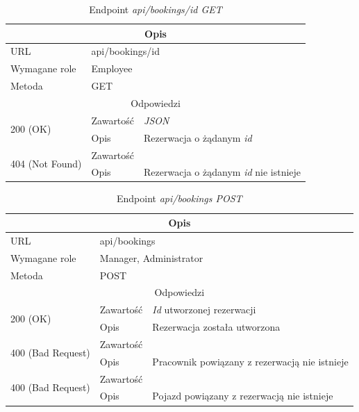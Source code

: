\documentclass[eng,printmode,openany]{mgr}
\begin{document}
\begin{table}[H]
	\caption{Endpoint \textit{api/bookings/id GET}}
	\begin{tabularx}{\textwidth}{|l|l|X|}
		\hline
		\multicolumn{3}{|c|}{Opis}
		\\ \hline
		URL                         & \multicolumn{2}{l|}{api/bookings/id}
		\\ \hline
		Wymagane role               & \multicolumn{2}{l|}{Employee}
		\\ \hline
		Metoda                      & \multicolumn{2}{l|}{GET}
		\\ \hline
		\multicolumn{3}{|c|}{Odpowiedzi}
		\\ \hline
		\multirow{2}{*}{200 (OK)} 	        & Zawartość   	& \textit{JSON}
		\\ \cline{2-3}                      & Opis         	& Rezerwacja o żądanym \textit{id}
		\\ \hline
		\multirow{2}{*}{404 (Not Found)} 	& Zawartość     & 
		\\ \cline{2-3}                      & Opis          & Rezerwacja o żądanym \textit{id} nie istnieje
		\\ \hline
	\end{tabularx}
\end{table}

\begin{table}[H]
	\caption{Endpoint \textit{api/bookings POST}}
	\begin{tabularx}{\textwidth}{|l|l|X|}
		\hline
		\multicolumn{3}{|c|}{Opis}
		\\ \hline
		URL                       & \multicolumn{2}{l|}{api/bookings}
		\\ \hline
		Wymagane role             & \multicolumn{2}{l|}{Manager, Administrator}
		\\ \hline
		Metoda                    & \multicolumn{2}{l|}{POST}
		\\ \hline
		\multicolumn{3}{|c|}{Odpowiedzi}
		\\ \hline
		\multirow{2}{*}{200 (OK)} 		& Zawartość     & \textit{Id} utworzonej rezerwacji
		\\ \cline{2-3}                  & Opis         	& Rezerwacja została utworzona
		\\ \hline
		\multirow{2}{*}{400 (Bad Request)} 	& Zawartość     &    
		\\ \cline{2-3}                      & Opis          & Pracownik powiązany z rezerwacją nie istnieje      						    
		\\ \hline
		\multirow{2}{*}{400 (Bad Request)} 	& Zawartość     &    
		\\ \cline{2-3}                      & Opis          & Pojazd powiązany z rezerwacją nie istnieje      								
		\\ \hline      
	\end{tabularx}
\end{table}
\end{document}

